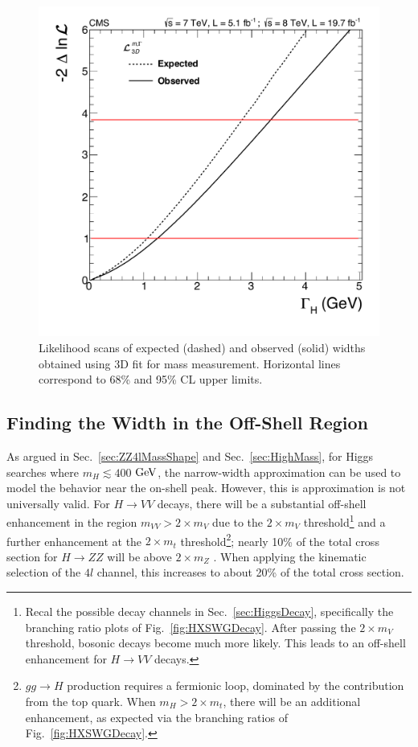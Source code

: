 \begin{figure}[htbp]
\begin{center}
\includegraphics[width=.7\linewidth]{HiggsProperties/figures/width_3D.pdf}
\caption[Direct Measurement of Higgs Width in $4l$ Decay Channel]{Likelihood scans of expected (dashed) and observed (solid) widths obtained using 3D fit for mass measurement. Horizontal lines correspond to 68\% and 95\% CL upper limits.}
\label{fig:DirectHiggsWidth}
\end{center}
\end{figure}

\subsection{Finding the Width in the Off-Shell Region}
\label{sec:OffShellPheno}

As argued in Sec.~\ref{sec:ZZ4lMassShape} and Sec.~\ref{sec:HighMass}, for Higgs searches where $m_H \lesssim 400$ $\rm{GeV}$, the narrow-width approximation can be used to model the behavior near the on-shell peak. However, this is approximation is not universally valid. For $H\rightarrow VV$ decays, there will be a substantial off-shell enhancement in the region $m_{VV} > 2\times m_{V}$ due to the $2\times m_{V}$ threshold\footnote{Recal the possible decay channels in Sec.~\ref{sec:HiggsDecay}, specifically the branching ratio plots of Fig.~\ref{fig:HXSWGDecay}. After passing the $2\times m_{V}$ threshold, bosonic decays become much more likely. This leads to an off-shell enhancement for $H\rightarrow VV$ decays.} and a further enhancement at the $2\times m_{t}$ threshold\footnote{$gg\rightarrow H$ production requires a fermionic loop, dominated by the contribution from the top quark. When $m_H > 2\times m_{t}$, there will be an additional enhancement, as expected via the branching ratios of Fig.~\ref{fig:HXSWGDecay}.}; nearly 10\% of the total cross section for $H\rightarrow ZZ$ will be above $2\times m_{Z}$ \cite{Kauer:2012hd,Kauer:1305.2092}. When applying the kinematic selection of the $4l$ channel, this increases to about 20\% of the total cross section. 


